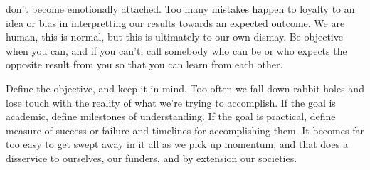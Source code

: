 don't become emotionally attached. Too many mistakes happen to loyalty to an idea or bias in interpretting our results
towards an expected outcome. We are human, this is normal, but this is ultimately to our own dismay. Be objective when
you can, and if you can't, call somebody who can be or who expects the opposite result from you so that you can learn
from each other.

Define the objective, and keep it in mind. Too often we fall down rabbit holes and lose touch with the reality of what
we're trying to accomplish. If the goal is academic, define milestones of understanding. If the goal is practical,
define measure of success or failure and timelines for accomplishing them. It becomes far too easy to get swept away in
it all as we pick up momentum, and that does a disservice to ourselves, our funders, and by extension our societies.

